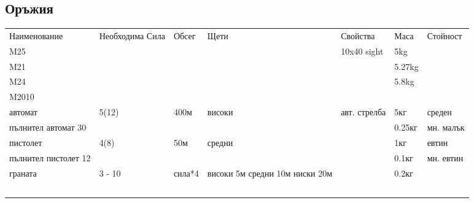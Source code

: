 \subsection{Оръжия}
\begin{tabular}{p{2cm} | p{2cm} | p{2cm} | p{2cm} | p{2cm} | p{2cm} | p{2cm}}
Наименование          & Необходима Сила      & Обсег      & Щети       & Свойства       & Маса  & Стойност         \\
M25                   &                      &            &            & 10x40 sight    & 5kg   &                  \\ %
M21                   &                      &            &            &                & 5.27kg&                  \\ %
M24                   &                      &            &            &                & 5.8kg &                  \\ %
M2010                 &                      &            &            &                &       &                  \\
автомат               & 5(12)                & 400м       & високи     & авт. стрелба   & 5кг   & среден           \\
пълнител автомат 30   &                      &            &            &                & 0.25кг& мн. малък        \\
пистолет              & 4(8)                 & 50м        & средни     &                & 1кг   & евтин            \\
пълнител пистолет 12  &                      &            &            &                & 0.1кг & мн. евтин        \\
граната               & 3 - 10               & сила*4     & високи 5м средни 10м ниски 20м &                & 0.2кг\\
                      &                      &            &            &                &                          \\
                      &                      &            &            &                &                          \\
                      &                      &            &            &                &                          \\
                      &                      &            &            &                &                          \\
                      &                      &            &            &                &                          \\

\end{tabular}
